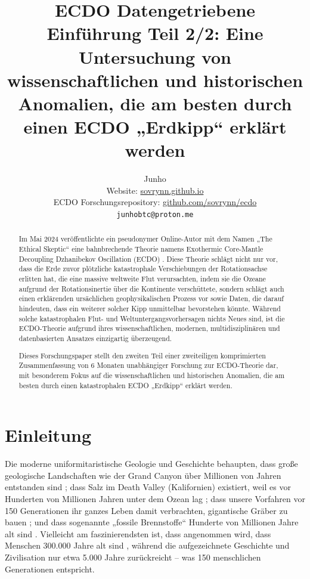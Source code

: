 \documentclass[10pt,twocolumn,letterpaper]{article}
\begin{document}
\title{ECDO Datengetriebene Einführung Teil 2/2: Eine Untersuchung von wissenschaftlichen und historischen Anomalien, die am besten durch einen ECDO „Erdkipp“ erklärt werden}

\author{Junho\\
Website: \href{https://sovrynn.github.io}{sovrynn.github.io}\\
ECDO Forschungsrepository: \href{https://github.com/sovrynn/ecdo}{github.com/sovrynn/ecdo}\\
{\tt\small junhobtc@proton.me}
}

\maketitle

\begin{abstract}
Im Mai 2024 veröffentlichte ein pseudonymer Online-Autor mit dem Namen „The Ethical Skeptic“ \cite{0} eine bahnbrechende Theorie namens Exothermic Core-Mantle Decoupling Dzhanibekov Oscillation (ECDO) \cite{1}. Diese Theorie schlägt nicht nur vor, dass die Erde zuvor plötzliche katastrophale Verschiebungen der Rotationsachse erlitten hat, die eine massive weltweite Flut verursachten, indem sie die Ozeane aufgrund der Rotationsinertie über die Kontinente verschüttete, sondern schlägt auch einen erklärenden ursächlichen geophysikalischen Prozess vor sowie Daten, die darauf hindeuten, dass ein weiterer solcher Kipp unmittelbar bevorstehen könnte. Während solche katastrophalen Flut- und Weltuntergangsvorhersagen nichts Neues sind, ist die ECDO-Theorie aufgrund ihres wissenschaftlichen, modernen, multidisziplinären und datenbasierten Ansatzes einzigartig überzeugend.

Dieses Forschungspaper stellt den zweiten Teil einer zweiteiligen komprimierten Zusammenfassung von 6 Monaten unabhängiger Forschung \cite{2,20} zur ECDO-Theorie dar, mit besonderem Fokus auf die wissenschaftlichen und historischen Anomalien, die am besten durch einen katastrophalen ECDO „Erdkipp“ erklärt werden.

\end{abstract}


\section{Einleitung}

Die moderne uniformitaristische Geologie und Geschichte behaupten, dass große geologische Landschaften wie der Grand Canyon über Millionen von Jahren entstanden sind \cite{143}; dass Salz im Death Valley (Kalifornien) existiert, weil es vor Hunderten von Millionen Jahren unter dem Ozean lag \cite{144}; dass unsere Vorfahren vor 150 Generationen ihr ganzes Leben damit verbrachten, gigantische Gräber zu bauen \cite{29,70}; und dass sogenannte „fossile Brennstoffe“ Hunderte von Millionen Jahre alt sind \cite{104}. Vielleicht am faszinierendsten ist, dass angenommen wird, dass Menschen 300.000 Jahre alt sind \cite{145}, während die aufgezeichnete Geschichte und Zivilisation nur etwa 5.000 Jahre zurückreicht – was 150 menschlichen Generationen entspricht.
\end{document}
